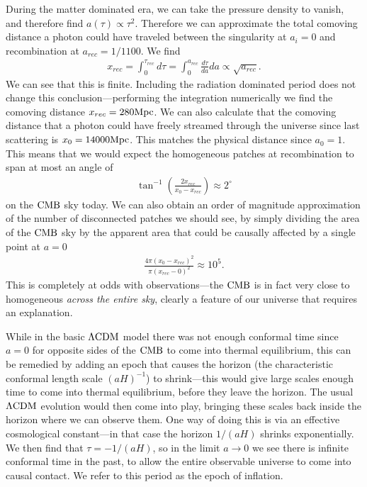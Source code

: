     During the matter dominated era, we can take the pressure density to vanish, and
    therefore find $a(\tau)\propto \tau^2$. Therefore we can approximate
    the total comoving distance a photon could have traveled between the singularity at $a_i=0$
    and recombination at $a_{rec}=1/1100$. We find
    \begin{align}
        x_{rec} = \int_{0}^{\tau_{rec}} d \tau = \int_{0}^{a_{rec}} \frac{d\tau}{da}da \propto \sqrt{a_{rec}}.
    \end{align}
    We can see that this is finite.
    Including the radiation dominated period does not change this conclusion---performing
    the integration numerically we find the comoving distance $x_{rec}=280\text{Mpc}$.
    We can also calculate that the comoving distance that a photon could have
    freely streamed through the universe since
    last scattering is $x_0=14000\text{Mpc}$. This matches the physical distance
    since $a_0=1$.
    This means that we would expect the homogeneous patches at recombination to span
    at most an angle of
    \begin{align}
        \tan^{-1}\left(\frac{2x_{rec}}{x_{0}-x_{rec}}\right) \approx 2^{\circ}
    \end{align}
    on the $\text{CMB}$ sky today.
    We can also obtain an order of magnitude approximation of the number of disconnected patches
    we should see, by simply dividing the area of the $\text{CMB}$ sky by the apparent
    area that could be causally affected by a single point at $a=0$
    \begin{align}
        \frac{4\pi(x_{0}-x_{rec})^2}{\pi(x_{rec}-0)^2} \approx 10^5.
    \end{align}
    This is completely at odds with observations---the $\text{CMB}$ is in fact very close to
    homogeneous \textit{across the entire sky}, clearly a feature of our universe
    that requires an explanation.


    While in the basic $\Lambda\text{CDM}$ model there was not enough conformal time since $a=0$ for
    opposite sides of the $\text{CMB}$ to come into thermal equilibrium, this can be remedied by
    adding an epoch that causes the horizon (the characteristic conformal length scale $(aH)^{-1}$)
    to shrink---this would give large scales enough time
    to come into thermal equilibrium, before they leave the horizon. The usual $\Lambda\text{CDM}$ evolution
    would then come into play, bringing these scales back inside the horizon where we can observe them.
    One way of doing this is via an effective cosmological constant---in that case the horizon $1/(aH)$ shrinks
    exponentially. We then find that $\tau=-1/(aH)$, so in the limit $a\rightarrow 0$ we see there is
    infinite conformal time in the past, to allow the entire observable universe to come into
    causal contact. We refer to this period as the epoch of inflation.


